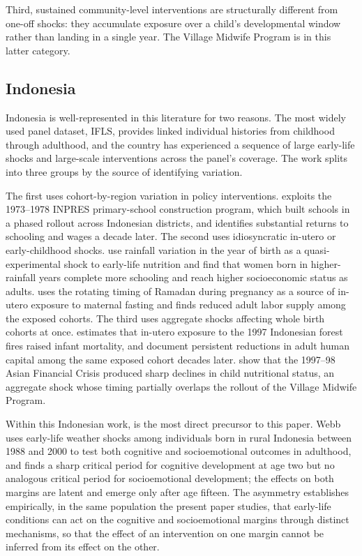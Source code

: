 Third, sustained community-level interventions are structurally different from one-off shocks: they accumulate exposure over a child's developmental window rather than landing in a single year. The Village Midwife Program is in this latter category.

\subsection{Indonesia}

Indonesia is well-represented in this literature for two reasons. The most widely used panel dataset, IFLS, provides linked individual histories from childhood through adulthood, and the country has experienced a sequence of large early-life shocks and large-scale interventions across the panel's coverage. The work splits into three groups by the source of identifying variation.

The first uses cohort-by-region variation in policy interventions. \textcite{duflo2001} exploits the 1973--1978 INPRES primary-school construction program, which built schools in a phased rollout across Indonesian districts, and identifies substantial returns to schooling and wages a decade later. The second uses idiosyncratic in-utero or early-childhood shocks. \textcite{maccini2009} use rainfall variation in the year of birth as a quasi-experimental shock to early-life nutrition and find that women born in higher-rainfall years complete more schooling and reach higher socioeconomic status as adults. \textcite{majid2015} uses the rotating timing of Ramadan during pregnancy as a source of in-utero exposure to maternal fasting and finds reduced adult labor supply among the exposed cohorts. The third uses aggregate shocks affecting whole birth cohorts at once. \textcite{jayachandran2009} estimates that in-utero exposure to the 1997 Indonesian forest fires raised infant mortality, and \textcite{rosalesrueda2019} document persistent reductions in adult human capital among the same exposed cohort decades later. \textcite{giles2015} show that the 1997--98 Asian Financial Crisis produced sharp declines in child nutritional status, an aggregate shock whose timing partially overlaps the rollout of the Village Midwife Program.

Within this Indonesian work, \textcite{webb2024} is the most direct precursor to this paper. Webb uses early-life weather shocks among individuals born in rural Indonesia between 1988 and 2000 to test both cognitive and socioemotional outcomes in adulthood, and finds a sharp critical period for cognitive development at age two but no analogous critical period for socioemotional development; the effects on both margins are latent and emerge only after age fifteen. The asymmetry establishes empirically, in the same population the present paper studies, that early-life conditions can act on the cognitive and socioemotional margins through distinct mechanisms, so that the effect of an intervention on one margin cannot be inferred from its effect on the other.

